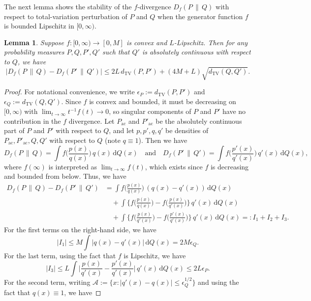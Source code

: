 \documentclass[11pt]{article}
\newtheorem{lemma}[thm]{Lemma}
\begin{document}
The next lemma shows the stability of the $f$-divergence $D_f(P\,\|\,Q)$ with respect to total-variation perturbation of $P$ and $Q$ when the generator function $f$ is bounded Lipschitz in $[0,\infty)$. 
\begin{lemma}
\label{Lemma:DivergenceStability}
    Suppose $f:[0,\infty)\to [0,M]$ is convex and $L$-Lipschitz. Then for any probability measures $P, Q, P', Q'$ such that $Q'$ is absolutely continuous with respect to $Q$, we have 
    \[  
    |D_f(P\,\|\, Q) - D_f(P'\,\|\, Q')| \leq 2L\,d_{\mathrm{TV}}(P, P') + (4M+L) \sqrt{d_{\mathrm{TV}}(Q, Q')}.
    \]
\end{lemma}
\begin{proof}
    For notational convenience, we write $\epsilon_P := d_{\mathrm{TV}}(P,P')$ and $\epsilon_Q := d_{\mathrm{TV}}(Q,Q')$. Since $f$ is convex and bounded, it must be decreasing on $[0, \infty)$ with $\lim_{t\to\infty} t^{-1}f(t) \to 0$, so singular components of $P$ and $P'$ have no contribution in the $f$ divergence. Let $P_{\mathrm{ac}}$ and $P'_{\mathrm{ac}}$ be the absolutely continuous part of $P$ and $P'$ with respect to $Q$, and let $p, p', q, q'$ be densities of $P_{\mathrm{ac}}, P'_{\mathrm{ac}}, Q, Q'$ with respect to $Q$ (note $q\equiv 1$). Then we have
    \[
    D_f(P\,\|\, Q) = \int f\biggl(\frac{p(x)}{q(x)}\biggr)\,q(x)\, \mathrm{d}Q(x) \quad \text{and}\quad  D_f(P'\,\|\, Q') = \int f\biggl(\frac{p'(x)}{q'(x)}\biggr)\,q'(x)\, \mathrm{d}Q(x),
    \]
    where $f(\infty)$ is interpreted as $\lim_{t\to\infty}f(t)$, which exists since $f$ is decreasing and bounded from below. Thus, we have 
    \begin{align*}
        D_f(P\,\|\, Q) - D_f(P'\,\|\, Q') &= \int f\biggl(\frac{p(x)}{q(x)}\biggr)\,(q(x) - q'(x))\, \mathrm{d}Q(x)\\
        &\quad + \int \biggl\{f\biggl(\frac{p(x)}{q(x)}\biggr) - f\biggl(\frac{p(x)}{q'(x)}\biggr)\biggr\}\,q'(x)\, \mathrm{d}Q(x)\\
       & \quad  + \int \biggl\{f\biggl(\frac{p(x)}{q'(x)}\biggr) - f\biggl(\frac{p'(x)}{q'(x)}\biggr)\biggr\}\,q'(x)\, \mathrm{d}Q(x) =: I_1+ I_2+ I_3.
    \end{align*}
    For the first terms on the right-hand side, we have
    \[
        |I_1| \leq M\int |q(x)-q'(x)|\, \mathrm{d}Q(x) = 2M\epsilon_Q.
    \]
    For the last term, using the fact that $f$ is Lipschitz, we have
    \[  
     |I_3| \leq L\int \biggl|\frac{p(x)}{q'(x)}-\frac{p'(x)}{q'(x)}\biggr| \, q'(x) \, \mathrm{d}Q(x) \leq 2L\epsilon_P.
    \]
    For the second term, writing $\mathcal{A}:=\{x:|q'(x)-q(x)|\leq \epsilon_Q^{1/2}\}$ and using the fact that $q(x) \equiv 1$, we have 

\end{proof}
\end{document}
